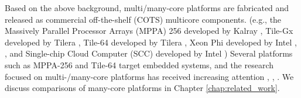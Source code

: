 


Based on the above background, multi/many-core platforms are fabricated and released as commercial off-the-shelf (COTS) multicore components.
(e.g., the Massively Parallel Processor Arrays (MPPA) 256 developed by Kalray \cite{de2014time}, Tile-Gx developed by Tilera \cite{ramey2011tile} \cite{schooler2010tile}, Tile-64 developed by Tilera \cite{bell2008tile64}, Xeon Phi developed by Intel \cite{chrysos2014intel}, \cite{chrysos2012intel}, and Single-chip Cloud Computer (SCC) developed by Intel \cite{baron2010single})
Several platforms such as MPPA-256 and Tile-64 target embedded systems, and the research focused on multi-/many-core platforms has received increasing attention \cite{kanter2015kalray}, \cite{denet2017work}, \cite{perret2016predictable}.
We discuss comparisons of many-core platforms in Chapter \ref{chap:related_work}.

